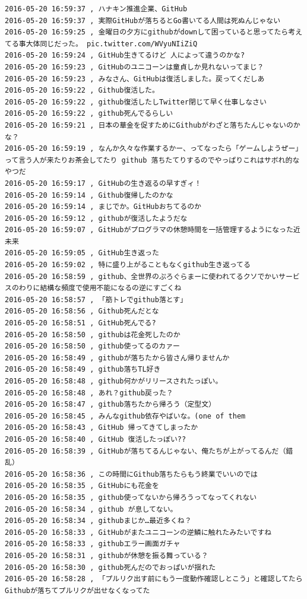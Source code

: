 \begin{verbatim}
2016-05-20 16:59:37 , ハナキン推進企業、GitHub 
2016-05-20 16:59:37 , 実際GitHubが落ちるとGo書いてる人間は死ぬんじゃない
2016-05-20 16:59:25 , 金曜日の夕方にgithubがdownして困っていると思ってたら考えてる事大体同じだった。 pic.twitter.com/WVyuNIiZiQ
2016-05-20 16:59:24 , GitHub生きてるけど 人によって違うのかな?
2016-05-20 16:59:23 , GitHubのユニコーンは童貞しか見れないってまじ？
2016-05-20 16:59:23 , みなさん、GitHubは復活しました。戻ってくだしあ
2016-05-20 16:59:22 , Github復活した。
2016-05-20 16:59:22 , github復活したしTwitter閉じて早く仕事しなさい
2016-05-20 16:59:22 , github死んでるらしい
2016-05-20 16:59:21 , 日本の華金を促すためにGithubがわざと落ちたんじゃないのかな？
2016-05-20 16:59:19 , なんか久々な作業するかー、ってなったら「ゲームしようぜー」って言う人が来たりお茶会してたり github 落ちたてりするのでやっぱりこれはサボれ的なやつだ
2016-05-20 16:59:17 , GitHubの生き返るの早すぎィ！
2016-05-20 16:59:14 , Github復帰したのかな
2016-05-20 16:59:14 , まじでか。GitHubおちてるのか
2016-05-20 16:59:12 , githubが復活したようだな
2016-05-20 16:59:07 , GitHubがプログラマの休憩時間を一括管理するようになった近未来
2016-05-20 16:59:05 , GitHub生き返った
2016-05-20 16:59:02 , 特に盛り上がることもなくgithub生き返ってる
2016-05-20 16:58:59 , github、全世界のぷろぐらまーに使われてるクソでかいサービスのわりに結構な頻度で使用不能になるの逆にすごくね
2016-05-20 16:58:57 , 「筋トレでgithub落とす」
2016-05-20 16:58:56 , Github死んだとな
2016-05-20 16:58:51 , GitHub死んでる?
2016-05-20 16:58:50 , githubは花金死したのか
2016-05-20 16:58:50 , github使ってるのカァー
2016-05-20 16:58:49 , githubが落ちたから皆さん帰りませんか
2016-05-20 16:58:49 , github落ちTL好き
2016-05-20 16:58:48 , github何かがリリースされたっぽい。
2016-05-20 16:58:48 , あれ？github戻った？
2016-05-20 16:58:47 , github落ちたから帰ろう（定型文）
2016-05-20 16:58:45 , みんなgithub依存やばいな。(one of them
2016-05-20 16:58:43 , GitHub 帰ってきてしまったか
2016-05-20 16:58:40 , GitHub 復活したっぽい??
2016-05-20 16:58:39 , GitHubが落ちてるんじゃない、俺たちが上がってるんだ（錯乱）
2016-05-20 16:58:36 , この時間にGithub落ちたらもう終業でいいのでは
2016-05-20 16:58:35 , GitHubにも花金を
2016-05-20 16:58:35 , github使ってないから帰ろうってなってくれない
2016-05-20 16:58:34 , github が息してない。
2016-05-20 16:58:34 , githubまじか…最近多くね？
2016-05-20 16:58:33 , GitHubがまたユニコーンの逆鱗に触れたみたいですね
2016-05-20 16:58:33 , githubエラー画面ガチャ
2016-05-20 16:58:31 , githubが休憩を振る舞っている？
2016-05-20 16:58:30 , github死んだのでおっぱいが揺れた
2016-05-20 16:58:28 , 「プルリク出す前にもう一度動作確認しとこう」と確認してたらGithubが落ちてプルリクが出せなくなってた

\end{verbatim}
